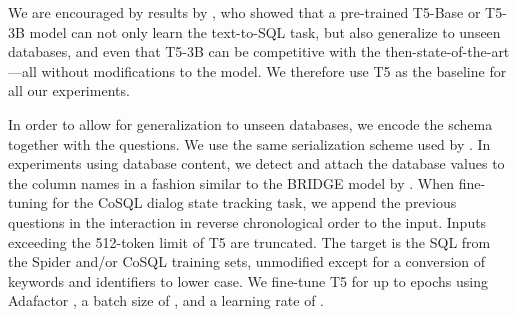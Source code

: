 \documentclass[11pt]{article}
\newcommand{\texttosql}{text-to-SQL}
\begin{document}
We are encouraged by results by \citet{shaw2020compositional},
who showed that a pre-trained T5-Base or T5-3B model
can not only learn the \texttosql{} task,
but also generalize to unseen databases,
and even that T5-3B can be competitive
with the then-state-of-the-art \citep{Choi_2021,Wang_2020}---all without modifications to the model.
We therefore use T5 as the baseline for all our experiments.

In order to allow for
generalization to unseen databases,
we encode the schema together with the questions.
We use the same serialization scheme used by \citet{shaw2020compositional}.
In experiments using database content,
we detect and attach the database values to the column names
in a fashion similar to the BRIDGE model by \citet{Lin_2020}.
When fine-tuning for the CoSQL dialog state tracking task,
we append the previous questions in the interaction in reverse chronological order to the input.
Inputs exceeding the 512-token limit of T5 are truncated.
The target is the SQL from the Spider and/or CoSQL training sets,
unmodified except for a conversion of keywords and identifiers to lower case.
We fine-tune T5 for up to  epochs
using Adafactor \citep{shazeer2018adafactor},
a batch size of ,
and a learning rate of .
\end{document}
